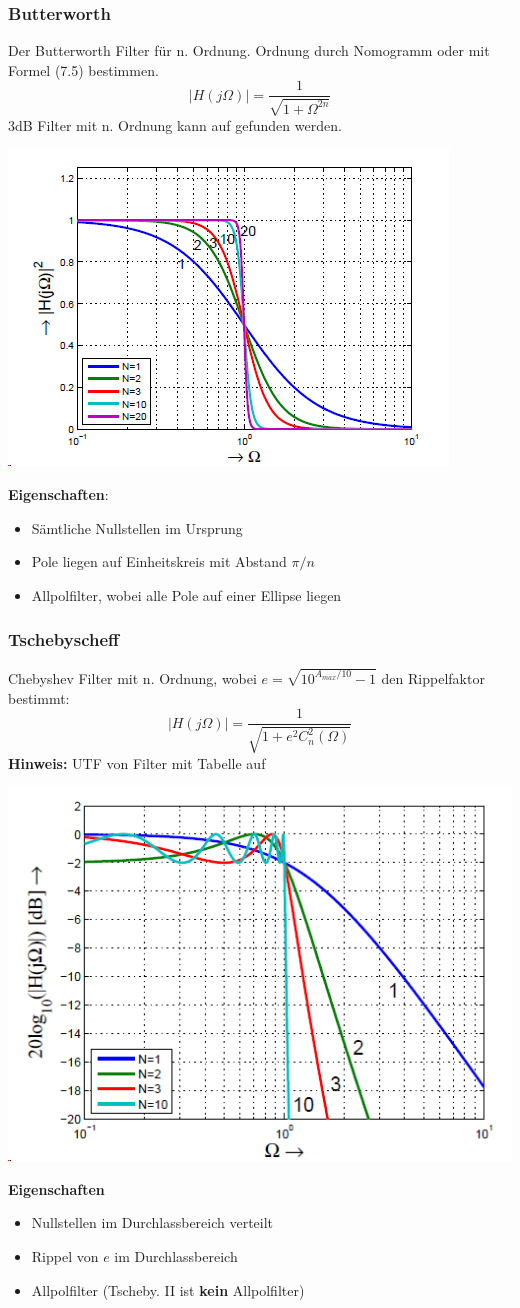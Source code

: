 \subsubsection{Butterworth}
Der Butterworth Filter für n. Ordnung. Ordnung durch Nomogramm oder mit Formel  (7.5) bestimmen.
\[
\left|H(j\Omega)\right| = \frac{1}{\sqrt{1 + \Omega^{2n}}}
\]
3dB Filter mit n. Ordnung kann auf  gefunden werden.
\begin{center}
	\includegraphics[width=0.6\columnwidth]{Images/butterworth}
\end{center}
\noindent\textbf{Eigenschaften}:
\begin{itemize}[nosep]
	\item Sämtliche Nullstellen im Ursprung
	\item Pole liegen auf Einheitskreis mit Abstand $\pi/n$
	\item Allpolfilter, wobei alle Pole auf einer Ellipse liegen
\end{itemize}

\subsubsection{Tschebyscheff}
Chebyshev Filter mit n. Ordnung, wobei $e=\sqrt{10^{A_{max}/10}-1}$ den Rippelfaktor bestimmt:
\[
\left|H(j\Omega)\right| = \frac{1}{\sqrt{1+ e^2C_n^2(\Omega)}}
\]
\textbf{Hinweis:} UTF von Filter mit Tabelle auf ~\\
\begin{center}
	\includegraphics[width=0.6\columnwidth]{Images/tschebyscheff}
\end{center}
\noindent\textbf{Eigenschaften}
\begin{itemize}[nosep]
	\item Nullstellen im Durchlassbereich verteilt
	\item Rippel von $e$ im Durchlassbereich
	\item Allpolfilter (Tscheby. II ist \textbf{kein} Allpolfilter)
\end{itemize}

